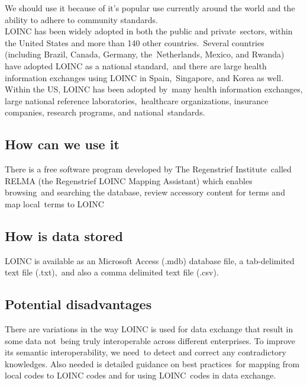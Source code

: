 We should use it because of it's popular use currently around the world and the ability to adhere to community standards.\\

\noindent LOINC has been widely adopted in both the public and private\
sectors, within the United States and more than 140 other countries.\
Several countries (including Brazil, Canada, Germany, the\
Netherlands, Mexico, and Rwanda) have adopted LOINC as a national standard,\
 and there are large health information exchanges using LOINC in Spain,\
 Singapore, and Korea as well. Within the US, LOINC has been adopted by\
 many health information exchanges, large national reference laboratories,\
 healthcare organizations, insurance companies, research programs, and national\
standards.\citep{kroth_using_2012} 

 \subsection{How can we use it}

  There is a free software program developed by The Regenstrief Institute\
  called RELMA (the Regenstrief LOINC Mapping Assistant) which enables browsing\
  and searching the database, review accessory content for terms and map local\
  terms to LOINC \citep{kroth_using_2012} 

  \subsection{How is data stored}

LOINC is available as an Microsoft Access (.mdb) database file, a tab-delimited text file (.txt),\
 and also a comma delimited text file (.csv).\citep{_Vreeman_2013}\

 \subsection{Potential disadvantages}

 There are variations in the way LOINC is used for data exchange that result in some data not\
being truly interoperable across different enterprises. To improve its semantic interoperability, we need\
to detect and correct any contradictory knowledges. Also needed is detailed guidance on best practices\
for mapping from local codes to LOINC codes and for using LOINC\ 
codes in data exchange. \citep{lin_auditing_2012}



